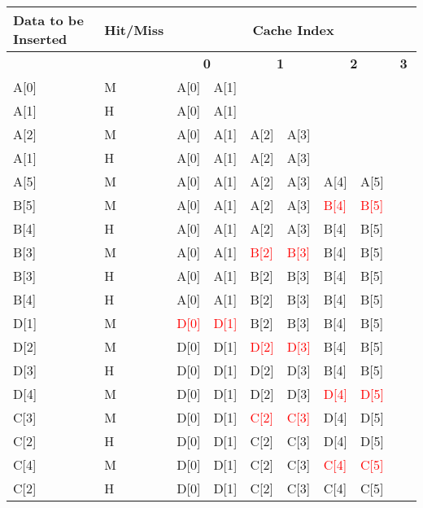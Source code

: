 \documentclass[addpoints]{exam}
\begin{document}
\begin{sloppypar}
\begin{questions}
    \begin{tabular}{|m{15mm} | m{17mm} | m{8.5mm} |m{8.5mm} |m{8.5mm} |m{8.5mm} |m{8.5mm} |m{8.5mm} |m{8.5mm} |m{8.5mm} |}
        \hline
        \raggedright\textbf{Data to \hspace*{3.5mm} be Inserted} &\raggedright \textbf{Hit/Miss} & \multicolumn{8}{|c|}{\textbf{Cache Index}} \\ \hline 
        & & \multicolumn{2}{|c|}{\textbf{0}} & \multicolumn{2}{|c|}{\textbf{1}} & \multicolumn{2}{|c|}{\textbf{2}} & \multicolumn{2}{|c|}{\textbf{3}} \\ \hline
        A[0] & M & A[0] & A[1] & & & & & & \\ \hline
        A[1] & H & A[0] & \textcolor{my_green}{A[1]} & & & & & & \\ \hline
        A[2] & M & A[0] & A[1] & A[2] & A[3] & & & & \\ \hline
        A[1] & H & A[0] & \textcolor{my_green}{A[1]} & A[2] & A[3] & & & & \\ \hline
        A[5] & M & A[0] & A[1] & A[2] & A[3] & A[4] & A[5] & & \\ \hline
        B[5] & M & A[0] & A[1] & A[2] & A[3] & \textcolor{red}{B[4]} & \textcolor{red}{B[5]} & & \\ \hline
        B[4] & H & A[0] & A[1] & A[2] & A[3] & \textcolor{my_green}{B[4]} & B[5] & & \\ \hline
        B[3] & M & A[0] & A[1] & \textcolor{red}{B[2]} & \textcolor{red}{B[3]} & B[4] & B[5] & & \\ \hline
        B[3] & H & A[0] & A[1] & B[2] & \textcolor{my_green}{B[3]} & B[4] & B[5] & & \\ \hline
        B[4] & H & A[0] & A[1] & B[2] & B[3] & \textcolor{my_green}{B[4]} & B[5] & & \\ \hline
        D[1] & M & \textcolor{red}{D[0]} & \textcolor{red}{D[1]} & B[2] & B[3] & B[4] & B[5] & & \\ \hline
        D[2] & M & D[0] & D[1] & \textcolor{red}{D[2]} & \textcolor{red}{D[3]} & B[4] & B[5] & & \\ \hline
        D[3] & H & D[0] & D[1] & D[2] & \textcolor{my_green}{D[3]} & B[4] & B[5] & & \\ \hline
        D[4] & M & D[0] & D[1] & D[2] & D[3] & \textcolor{red}{D[4]} & \textcolor{red}{D[5]} & & \\ \hline
        C[3] & M & D[0] & D[1] & \textcolor{red}{C[2]} & \textcolor{red}{C[3]} & D[4] & D[5] & & \\ \hline
        C[2] & H & D[0] & D[1] & \textcolor{my_green}{C[2]} & C[3] & D[4] & D[5] & & \\ \hline
        C[4] & M & D[0] & D[1] & C[2] & C[3] & \textcolor{red}{C[4]} & \textcolor{red}{C[5]} & & \\ \hline
        C[2] & H & D[0] & D[1] & \textcolor{my_green}{C[2]} & C[3] & C[4] & C[5] & & \\ \hline
    \end{tabular}


\end{questions}
\end{sloppypar}
\end{document}
